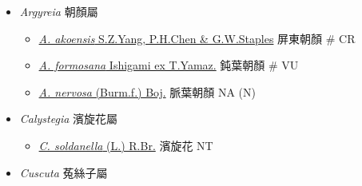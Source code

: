 
  \begin{itemize}
 \item[] \textit{Argyreia} 朝顏屬
                                
  \begin{itemize}
        \item[] \href{http://www.theplantlist.org/tpl1.1/search?q=Argyreia+akoensis}{\textit{A. akoensis} S.Z.Yang, P.H.Chen \& G.W.Staples}   屏東朝顏  \# CR
        \item[] \href{http://www.theplantlist.org/tpl1.1/search?q=Argyreia+formosana}{\textit{A. formosana} Ishigami ex T.Yamaz.}   鈍葉朝顏  \# VU
        \item[] \href{http://www.theplantlist.org/tpl1.1/search?q=Argyreia+nervosa}{\textit{A. nervosa} (Burm.f.) Boj.}   脈葉朝顏   NA (N)
  \end{itemize}
 \item[] \textit{Calystegia} 濱旋花屬
                                
  \begin{itemize}
        \item[] \href{http://www.theplantlist.org/tpl1.1/search?q=Calystegia+soldanella}{\textit{C. soldanella} (L.) R.Br.}   濱旋花   NT
  \end{itemize}
 \item[] \textit{Cuscuta} 菟絲子屬
                                

\end{itemize}
